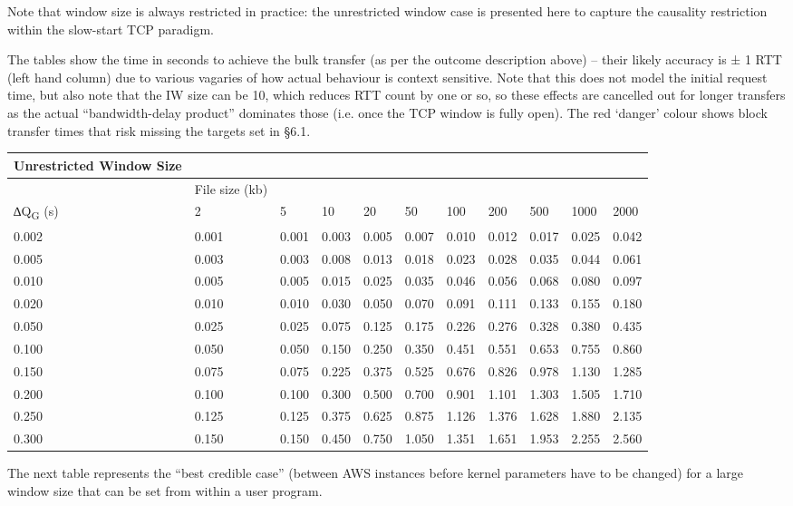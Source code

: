 \documentclass[11pt,a4paper]{article}
\begin{document}
Note that window size is always restricted in practice: the unrestricted
window case is presented here to capture the causality restriction
within the slow-start TCP paradigm.

The tables show the time in seconds to achieve the bulk transfer (as per
the outcome description above) -- their likely accuracy is ± 1 RTT (left
hand column) due to various vagaries of how actual behaviour is context
sensitive. Note that this does not model the initial request time, but
also note that the IW size can be 10, which reduces RTT count by one or
so, so these effects are cancelled out for longer transfers as the
actual ``bandwidth-delay product'' dominates those (i.e. once the TCP
window is fully open). The red `danger' colour shows block transfer
times that risk missing the targets set in §6.1.

\begin{longtable}[]{@{}lllllllllll@{}}
\toprule
Unrestricted Window Size & & & & & & & & & &\tabularnewline
\midrule
\endhead
& File size (kb) & & & & & & & & &\tabularnewline
∆Q\textbar{}\textsubscript{G} (s) & 2 & 5 & 10 & 20 & 50 & 100 & 200 &
500 & 1000 & 2000\tabularnewline
0.002 & 0.001 & 0.001 & 0.003 & 0.005 & 0.007 & 0.010 & 0.012 & 0.017 &
0.025 & 0.042\tabularnewline
0.005 & 0.003 & 0.003 & 0.008 & 0.013 & 0.018 & 0.023 & 0.028 & 0.035 &
0.044 & 0.061\tabularnewline
0.010 & 0.005 & 0.005 & 0.015 & 0.025 & 0.035 & 0.046 & 0.056 & 0.068 &
0.080 & 0.097\tabularnewline
0.020 & 0.010 & 0.010 & 0.030 & 0.050 & 0.070 & 0.091 & 0.111 & 0.133 &
0.155 & 0.180\tabularnewline
0.050 & 0.025 & 0.025 & 0.075 & 0.125 & 0.175 & 0.226 & 0.276 & 0.328 &
0.380 & 0.435\tabularnewline
0.100 & 0.050 & 0.050 & 0.150 & 0.250 & 0.350 & 0.451 & 0.551 & 0.653 &
0.755 & 0.860\tabularnewline
0.150 & 0.075 & 0.075 & 0.225 & 0.375 & 0.525 & 0.676 & 0.826 & 0.978 &
1.130 & 1.285\tabularnewline
0.200 & 0.100 & 0.100 & 0.300 & 0.500 & 0.700 & 0.901 & 1.101 & 1.303 &
1.505 & 1.710\tabularnewline
0.250 & 0.125 & 0.125 & 0.375 & 0.625 & 0.875 & 1.126 & 1.376 & 1.628 &
1.880 & 2.135\tabularnewline
0.300 & 0.150 & 0.150 & 0.450 & 0.750 & 1.050 & 1.351 & 1.651 & 1.953 &
2.255 & 2.560\tabularnewline
\bottomrule
\end{longtable}

The next table represents the ``best credible case'' (between AWS
instances before kernel parameters have to be changed) for a large
window size that can be set from within a user program.
\end{document}
